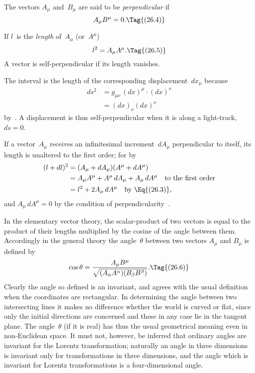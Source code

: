 \documentclass[12pt]{book}
\begin{document}
The vectors $A_{\mu}$ and~$B_{\mu}$ are said to be \emph{perpendicular} if
\[
A_{\mu} B^{\mu} = 0.
\Tag{(26.4)}
\]

If $l$~is the \emph{length} of~$A_{\mu}$ (or~$A^{\mu}$)
\[
l^{2} = A_{\mu} A^{\mu}.
\Tag{(26.5)}
\]
A vector is self-perpendicular if its length vanishes.

The interval is the length of the corresponding displacement~$dx_{\mu}$ because
\begin{align*}
  ds^{2} &= g_{\mu\nu}\, (dx)^{\mu} \cdot (dx)^{\nu} \\
  &= (dx)_{\nu} (dx)^{\nu}
\end{align*}
by~. A displacement is thus self-perpendicular when it is along a
light-track, $ds = 0$.

If a vector~$A_{\mu}$ receives an infinitesimal increment~$dA_{\mu}$ perpendicular to
itself, its length is unaltered to the first order; for by~
\begin{align*}
  (l + dl)^{2}
  &= (A_{\mu} + dA_{\mu}) (A^{\mu} + dA^{\mu}) \\
  &= A_{\mu} A^{\mu} + A^{\mu}\, dA_{\mu} + A_{\mu}\, dA^{\mu}\quad\text{to the first order} \\
  &= l^{2} + 2A_{\mu}\, dA^{\mu} \quad\text{by~\Eq{(26.3)},}
\end{align*}
and $A_{\mu}\, dA^{\mu} = 0$ by the condition of perpendicularity~.

In the elementary vector theory, the scalar-product of two vectors is
equal to the product of their lengths multiplied by the cosine of the angle
%
between them. Accordingly in the general theory the angle~$\theta$ between two
vectors $A_{\mu}$ and $B_{\mu}$ is defined by
\[
\cos\theta = \frac{A_{\mu} B^{\mu}}{\sqrt{(A_{\alpha} A^{\alpha}) (B_{\beta} B^{\beta})}}.
\Tag{(26.6)}
\]
Clearly the angle so defined is an invariant, and agrees with the usual
%
definition when the coordinates are rectangular. In determining the angle
between two intersecting lines it makes no difference whether the world is
curved or flat, since only the initial directions are concerned and these in any
case lie in the tangent plane. The angle~$\theta$ (if it is real) has thus the usual
geometrical meaning even in non-Euclidean space. It must not, however, be
inferred that ordinary angles are invariant for the Lorentz transformation;
naturally an angle in three dimensions is invariant only for transformations
in three dimensions, and the angle which is invariant for Lorentz transformations
is a four-dimensional angle.
\end{document}
